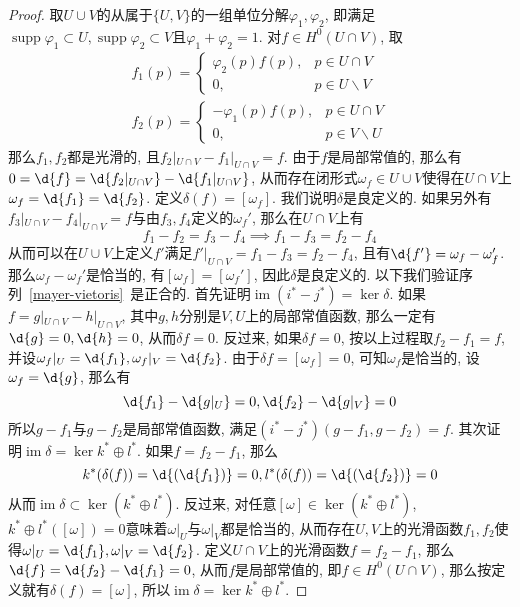 \documentclass[11pt]{article}
\theoremstyle{definition}\newtheorem*{analyse}{分析}
\theoremstyle{remark}\newtheorem{rem*}{评注}
\DeclareMathOperator{\supp}{supp}
\DeclareMathOperator{\im}{im}
\begin{document}
\begin{proof}
    取$U\cup V$的从属于$\{U,V\}$的一组单位分解$\varphi_1,\varphi_2$, 即满足$\supp\varphi_1\subset U,\supp\varphi_2\subset V$且$\varphi_1+\varphi_2=1$.
    对$f\in H^0(U\cap V)$, 取
    \begin{gather*}
        f_1(p)=\begin{cases}
            \varphi_2(p)f(p), & p\in U\cap V\\
            0, & p\in U\backslash V
        \end{cases}\\
        f_2(p)=\begin{cases}
            -\varphi_1(p)f(p), & p\in U\cap V\\
            0, & p\in V\backslash U
        \end{cases}
    \end{gather*}
    那么$f_1,f_2$都是光滑的, 且$f_2|_{U\cap V}-f_1|_{U\cap V}=f$.
    由于$f$是局部常值的, 那么有$0=\d{f}=\d{f_2|_{U\cap V}}-\d{f_1|_{U\cap V}}$, 从而存在闭形式$\omega_f\in U\cup V$使得在$U\cap V$上$\omega_f=\d{f_1}=\d{f_2}$.
    定义$\delta(f)=[\omega_f]$.
    我们说明$\delta$是良定义的.
    如果另外有$f_3|_{U\cap V}-f_4|_{U\cap V}=f$与由$f_3,f_4$定义的$\omega_f'$, 那么在$U\cap V$上有
    \[f_1-f_2=f_3-f_4\implies f_1-f_3=f_2-f_4\]
    从而可以在$U\cup V$上定义$f'$满足$f'|_{U\cap V}=f_1-f_3=f_2-f_4$, 且有$\d{f'}=\omega_f-\omega_f'$.
    那么$\omega_f-\omega_f'$是恰当的, 有$[\omega_f]=[\omega_f']$, 因此$\delta$是良定义的.
    以下我们验证序列~\eqref{mayer-vietoris}~是正合的.
    首先证明$\im(i^*-j^*)=\ker\delta$.
    如果$f=g|_{U\cap V}-h|_{U\cap V}$, 其中$g,h$分别是$V,U$上的局部常值函数, 那么一定有$\d{g}=0,\d{h}=0$, 从而$\delta{f}=0$.
    反过来, 如果$\delta{f}=0$, 按以上过程取$f_2-f_1=f$, 并设$\omega_f|_U=\d{f_1},\omega_f|_V=\d{f_2}$.
    由于$\delta{f}=[\omega_f]=0$, 可知$\omega_f$是恰当的, 设$\omega_f=\d{g}$, 那么有
    \[\d{f_1}-\d{g|_U}=0,\d{f_2}-\d{g|_V}=0\]
    所以$g-f_1$与$g-f_2$是局部常值函数, 满足$(i^*-j^*)(g-f_1,g-f_2)=f$.
    其次证明$\im\delta=\ker{k^*\oplus l^*}$.
    如果$f=f_2-f_1$, 那么
    \[k^*(\delta(f))=\d{(\d{f_1})}=0,l^*(\delta(f))=\d{(\d{f_2})}=0\]
    从而$\im\delta\subset\ker(k^*\oplus l^*)$.
    反过来, 对任意$[\omega]\in\ker(k^*\oplus l^*)$, $k^*\oplus l^*([\omega])=0$意味着$\omega|_U$与$\omega|_V$都是恰当的, 从而存在$U,V$上的光滑函数$f_1,f_2$使得$\omega|_U=\d{f_1},\omega|_V=\d{f_2}$.
    定义$U\cap V$上的光滑函数$f=f_2-f_1$, 那么$\d{f}=\d{f_2}-\d{f_1}=0$, 从而$f$是局部常值的, 即$f\in H^0(U\cap V)$, 那么按定义就有$\delta(f)=[\omega]$, 所以$\im\delta=\ker{k^*\oplus l^*}$.
\end{proof}
\end{document}
